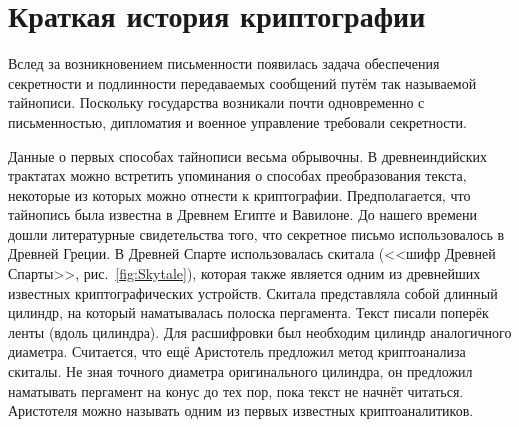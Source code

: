 \section{Краткая история криптографии}

Вслед за возникновением письменности появилась задача обеспечения секретности и подлинности передаваемых сообщений путём так называемой тайнописи. Поскольку государства возникали почти одновременно с письменностью, дипломатия и военное управление требовали секретности.

Данные о первых способах тайнописи весьма обрывочны. В древнеиндийских трактатах можно встретить упоминания о способах преобразования текста, некоторые из которых можно отнести к криптографии. Предполагается, что тайнопись была известна в Древнем Египте и Вавилоне. До нашего времени дошли литературные свидетельства того, что секретное письмо использовалось в Древней Греции. В Древней Спарте использовалась скитала (<<шифр Древней Спарты>>, рис.~\ref{fig:Skytale}), которая также является одним из древнейших известных криптографических устройств. Скитала представляла собой длинный цилиндр, на который наматывалась полоска пергамента. Текст писали поперёк ленты (вдоль цилиндра). Для расшифровки был необходим цилиндр аналогичного диаметра. Считается, что ещё Аристотель предложил метод криптоанализа скиталы. Не зная точного диаметра оригинального цилиндра, он предложил наматывать пергамент на конус до тех пор, пока текст не начнёт читаться. Аристотеля можно называть одним из первых известных криптоаналитиков.

